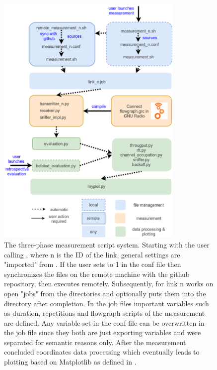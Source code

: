 \begin{figure}[tb]
	\label{fig:script-system}
	\begin{center}
		\includegraphics[width=0.8\textwidth]{pictures/script_system}
	\end{center}
	\caption{The three-phase measurement script system. Starting with the user calling , where n is the ID of the link, general settings are "imported" from . If the user sets  to 1 in the conf file then  synchronizes the files on the remote machine with the github repository, then executes  remotely. Subsequently,  for link n works on open "jobs" from the  directories and optionally puts them into the  directory after completion. In the job files important variables such as duration, repetitions and flowgraph scripts of the measurement are defined. Any variable set in the conf file can be overwritten in the job file since they both are just exporting variables and were separated for semantic reasons only. After the measurement concluded  coordinates data processing which eventually leads to plotting based on Matplotlib as defined in .}
\end{figure}

